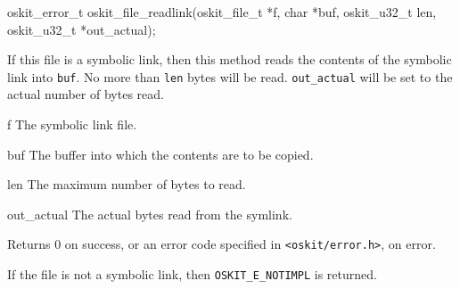 \begin{apisyn}

	\funcproto oskit_error_t
	oskit_file_readlink(oskit_file_t *f, char *buf, oskit_u32_t len,
			  \outparam oskit_u32_t *out_actual);
\end{apisyn}
\ostofs
\begin{apidesc}
	If this file is a symbolic link, then this method
	reads the contents of the symbolic link into {\tt buf}.	
	No more than {\tt len} bytes will be read.  {\tt out_actual} 
	will be set to the actual number of bytes read.
\end{apidesc}
\begin{apiparm}
	\item[f]
		The symbolic link file.
	\item[buf]
		The buffer into which the contents are to be copied.
	\item[len]
		The maximum number of bytes to read.
	\item[out_actual]
		The actual bytes read from the symlink.
\end{apiparm}
\begin{apiret}
	Returns 0 on success, or an error code specified in
	{\tt <oskit/error.h>}, on error.

	If the file is not a symbolic link, then {\tt OSKIT_E_NOTIMPL}
	is returned.
\end{apiret}


